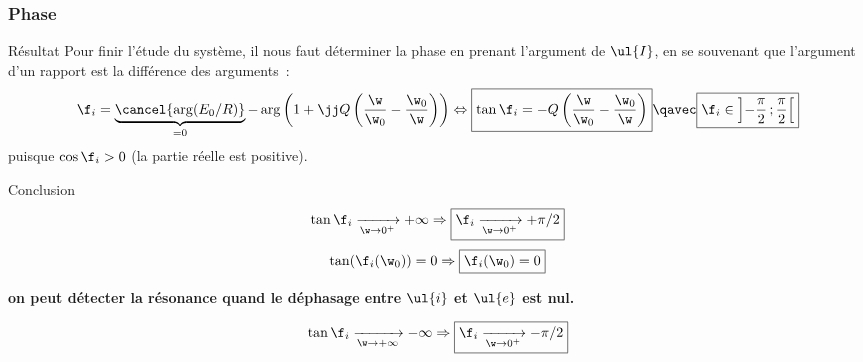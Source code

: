 \documentclass[../main/main.tex]{subfiles}
\begin{document}
\subsubsection{Phase}
\begin{rprop}{Résultat}
    Pour finir l'étude du système, il nous faut déterminer la phase en prenant
    l'argument de $\ul{I}$, en se souvenant que l'argument d'un rapport est la
    différence des arguments~:
    \begin{gather*}
        \f_i
            = \underbrace{\cancel{\arg(E_0/R)}}_{=0}
                - \arg \left( 1 + \jj Q \left(
                    \frac{\w}{\w_0} - \frac{\w_0}{\w}
                \right) \right)
        \Leftrightarrow
        \boxed{\tan\f_i = -Q\left( \frac{\w}{\w_0} - \frac{\w_0}{\w} \right)}
        \qavec
        \boxed{\f_i \in \left] - \frac{\pi}{2}\,; \frac{\pi}{2} \right[}
    \end{gather*}
    puisque $\cos\f_i > 0$ (la partie réelle est positive).
\end{rprop}
\begin{rror}{Conclusion}
    \[\tan\f_i \xrightarrow[\w\rightarrow0^+]{} +\infty \Rightarrow
        \boxed{\f_i \xrightarrow[\w\rightarrow0^+]{} +\pi/2}\]
    \[\tan(\f_i(\w_0)) = 0 \Rightarrow \boxed{\f_i(\w_0) = 0}\]
    \begin{center}
        \textbf{on peut détecter la résonance quand le déphasage entre
        $\ul{i}$ et $\ul{e}$ est nul.}
    \end{center}
    \[\tan\f_i \xrightarrow[\w\rightarrow+\infty]{} -\infty \Rightarrow
        \boxed{\f_i \xrightarrow[\w\rightarrow0^+]{} -\pi/2}\]
\end{rror}

\vspace{-20pt}
\end{document}
